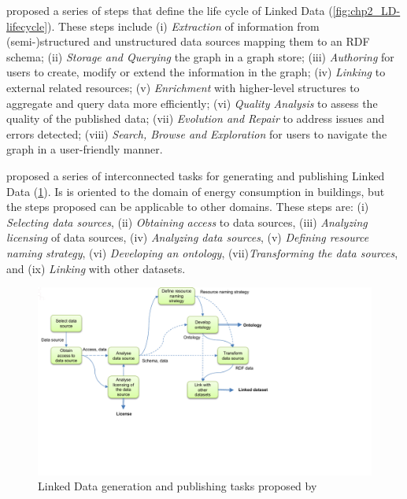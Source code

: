 \cite{ngomo2014LD-lifecycle} proposed a series of steps that define the life cycle of Linked Data (\cref{fig:chp2_LD-lifecycle}). 
These steps include 
(i) \textit{Extraction} of information from (semi-)structured and unstructured data sources mapping them to an RDF schema; 
(ii) \textit{Storage and Querying} the graph in a graph store; 
(iii) \textit{Authoring} for users to create, modify or extend the information in the graph;
(iv) \textit{Linking} to external related resources;
(v) \textit{Enrichment} with higher-level structures to aggregate and query data more efficiently;
(vi) \textit{Quality Analysis} to assess the quality of the published data;
(vii) \textit{Evolution and Repair} to address issues and errors detected;
(viii) \textit{Search, Browse and Exploration} for users to navigate the graph in a user-friendly manner. 

\cite{radulovic2015guidelinesLD} proposed a series of interconnected tasks for generating and publishing Linked Data (\cref{fig:chp2_LD-radulovic}). Is is oriented to the domain of energy consumption in buildings, but the steps proposed can be applicable to other domains. These steps are: (i) \textit{Selecting data sources}, (ii) \textit{Obtaining access} to data sources, (iii) \textit{Analyzing licensing} of data sources, (iv) \textit{Analyzing data sources}, (v) \textit{Defining resource naming strategy}, (vi) \textit{Developing an ontology}, (vii)\textit{Transforming the data sources}, and (ix) \textit{Linking} with other datasets. 

\begin{figure}[]
\centering
\includegraphics[width=0.8\linewidth]{figures/chp2_LD-radulovic.pdf}
\caption{Linked Data generation and publishing tasks proposed by \cite{radulovic2015guidelinesLD}}
\label{fig:chp2_LD-radulovic}
\end{figure}

